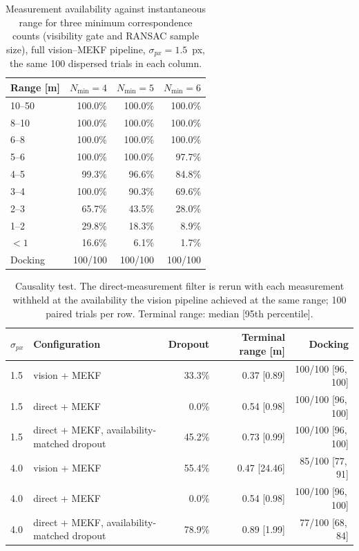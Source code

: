 \begin{table}[!tb]
\caption{Measurement availability against instantaneous range for three
minimum correspondence counts (visibility gate and RANSAC sample size), full vision--MEKF
pipeline, $\sigma_{px} = 1.5$~px, the same 100 dispersed trials in each column.}
\label{tab:nmin}
\centering
\begin{tabular}{lrrr}
\toprule
Range [m] & $N_{\min}=4$ & $N_{\min}=5$ & $N_{\min}=6$ \\
\midrule
10--50 & 100.0\% & 100.0\% & 100.0\% \\
8--10 & 100.0\% & 100.0\% & 100.0\% \\
6--8 & 100.0\% & 100.0\% & 100.0\% \\
5--6 & 100.0\% & 100.0\% & 97.7\% \\
4--5 & 99.3\% & 96.6\% & 84.8\% \\
3--4 & 100.0\% & 90.3\% & 69.6\% \\
2--3 & 65.7\% & 43.5\% & 28.0\% \\
1--2 & 29.8\% & 18.3\% & 8.9\% \\
$<1$ & 16.6\% & 6.1\% & 1.7\% \\
\midrule
Docking & 100/100 & 100/100 & 100/100 \\
\bottomrule
\end{tabular}
\end{table}

\begin{table}[!tb]
\caption{Causality test. The direct-measurement filter is rerun with each
measurement withheld at the availability the vision pipeline achieved at the same range;
100 paired trials per row. Terminal range: median [95th percentile].}
\label{tab:causality}
\centering
\begin{tabular}{llrrr}
\toprule
$\sigma_{px}$ & Configuration & Dropout & Terminal range [m] & Docking \\
\midrule
1.5 & vision + MEKF & 33.3\% & 0.37 [0.89] & 100/100 [96,\,100] \\
1.5 & direct + MEKF & 0.0\% & 0.54 [0.98] & 100/100 [96,\,100] \\
1.5 & direct + MEKF, availability-matched dropout & 45.2\% & 0.73 [0.99] & 100/100 [96,\,100] \\
4.0 & vision + MEKF & 55.4\% & 0.47 [24.46] & 85/100 [77,\,91] \\
4.0 & direct + MEKF & 0.0\% & 0.54 [0.98] & 100/100 [96,\,100] \\
4.0 & direct + MEKF, availability-matched dropout & 78.9\% & 0.89 [1.99] & 77/100 [68,\,84] \\
\bottomrule
\end{tabular}
\end{table}
